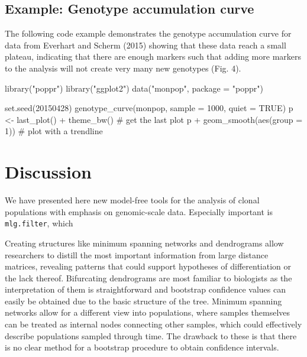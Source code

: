 \documentclass{frontiersSCNS} %
\newenvironment{CodeChunk}{}{}
\begin{document}
\subsection*{Example: Genotype accumulation
curve}\label{example-genotype-accumulation-curve}

The following code example demonstrates the genotype accumulation curve
for data from Everhart and Scherm (2015) showing that these data reach a
small plateau, indicating that there are enough markers such that adding
more markers to the analysis will not create very many new genotypes
(Fig. 4).

\begin{CodeChunk}
\begin{CodeInput}
library("poppr")
library("ggplot2")
data("monpop", package = "poppr")

set.seed(20150428)
genotype_curve(monpop, sample = 1000, quiet = TRUE)
p <- last_plot() + theme_bw()   # get the last plot
p + geom_smooth(aes(group = 1)) # plot with a trendline
\end{CodeInput}
\end{CodeChunk}

\section*{Discussion}\label{discussion}

We have presented here new model-free tools for the analysis of clonal
populations with emphasis on genomic-scale data. Especially important is
\texttt{mlg.filter}, which

Creating structures like minimum spanning networks and dendrograms allow
researchers to distill the most important information from large
distance matrices, revealing patterns that could support hypotheses of
differentiation or the lack thereof. Bifurcating dendrograms are most
familiar to biologists as the interpretation of them is straightforward
and bootstrap confidence values can easily be obtained due to the basic
structure of the tree. Minimum spanning networks allow for a different
view into populations, where samples themselves can be treated as
internal nodes connecting other samples, which could effectively
describe populations sampled through time. The drawback to these is that
there is no clear method for a bootstrap procedure to obtain confidence
intervals.
\end{document}

